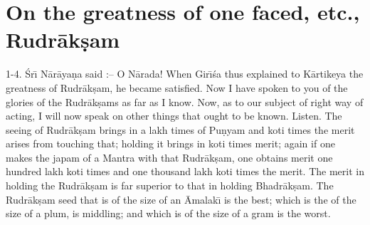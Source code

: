 \chapter{On the greatness of one faced, etc., Rudr\=ak\d{s}am}

1-4. \'Sr\={\i} N\=ar\=aya\d{n}a said :-- O N\=arada! When Gir\={\i}\'sa thus explained to K\=artikeya the greatness of Rudr\=ak\d{s}am, he became satisfied. Now I have spoken to you of the glories of the Rudr\=ak\d{s}ams as far as I know. Now, as to our subject of right way of acting, I will now speak on other things that ought to be known. Listen. The seeing of Rudr\=ak\d{s}am brings in a lakh times of Pu\d{n}yam and koti times the merit arises from touching that; holding it brings in koti times merit; again if one makes the japam of a Mantra with that Rudr\=ak\d{s}am, one obtains merit one hundred lakh koti times and one thousand lakh koti times the merit. The merit in holding the Rudr\=ak\d{s}am is far superior to that in holding Bhadr\=ak\d{s}am. The Rudr\=ak\d{s}am seed that is of the size of an \=Amalak\={\i} is the best; which is the of the size of a plum, is middling; and which is of the size of a gram is the worst.

